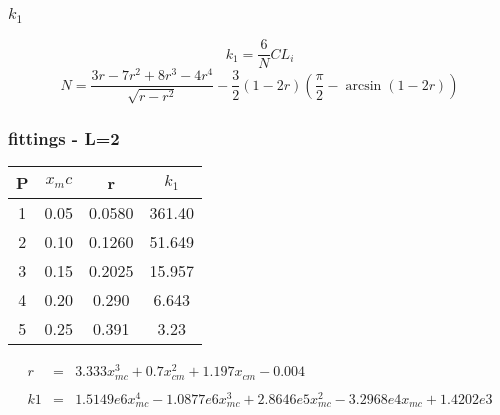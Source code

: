 \documentclass[11pt, a4paper]{article}
\begin{document}
\subsubsection{$k_1$}
\begin{equation}
    k_1=\frac{6}{N}CL_i
\end{equation}
\begin{equation}
    N=\frac{3r-7r^2+8r^3-4r^4}{\sqrt{r-r^2}}-\frac{3}{2}\left(1-2r\right)\left(\frac{\pi}{2}-\arcsin\left(1-2r\right)\right)
\end{equation}

\subsubsection{fittings - L=2} \begin{table}[H]
    \renewcommand{\arraystretch}{1.5}
    \begin{center}
        \begin{tabular}{c|c|c|c}
            P & $x_mc$ & r & $k_1$ \\
            \hline
            1 & 0.05 & 0.0580 & 361.40 \\
            2 & 0.10 & 0.1260 & 51.649 \\
            3 & 0.15 & 0.2025 & 15.957 \\
            4 & 0.20 & 0.290  & 6.643 \\
            5 & 0.25 & 0.391  & 3.23
        \end{tabular}
    \end{center}
\end{table}
\begin{equation}
    \begin{array}{rcl}
        r & = & 3.333x_{mc}^3+0.7x_{cm}^2+1.197x_{cm}-0.004 \\\\
        k1 & = & 1.5149e6x_{mc}^4-1.0877e6x_{mc}^3+2.8646e5x_{mc}^2-3.2968e4x_{mc}+1.4202e3
    \end{array}
\end{equation}
\end{document}
